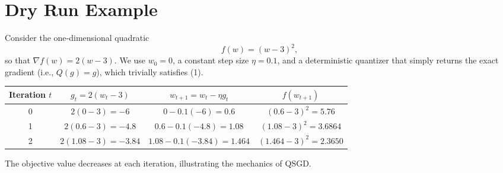\documentclass{article}
\begin{document}
\section*{Dry Run Example}
Consider the one‑dimensional quadratic
\[
f(w)=(w-3)^2,
\]
so that $\nabla f(w)=2(w-3)$.  
We use $w_0=0$, a constant step size $\eta=0.1$, and a deterministic quantizer that simply returns the exact gradient (i.e., $Q(g)=g$), which trivially satisfies (1).

\begin{center}
\begin{tabular}{c|c|c|c}
Iteration $t$ & $g_t=2(w_t-3)$ & $w_{t+1}=w_t-\eta g_t$ & $f(w_{t+1})$\\ \hline
0 & $2(0-3)=-6$ & $0-0.1(-6)=0.6$ & $(0.6-3)^2=5.76$\\
1 & $2(0.6-3)=-4.8$ & $0.6-0.1(-4.8)=1.08$ & $(1.08-3)^2=3.6864$\\
2 & $2(1.08-3)=-3.84$ & $1.08-0.1(-3.84)=1.464$ & $(1.464-3)^2=2.3650$\\
\end{tabular}
\end{center}
The objective value decreases at each iteration, illustrating the mechanics of QSGD.

\newpage
\end{document}
